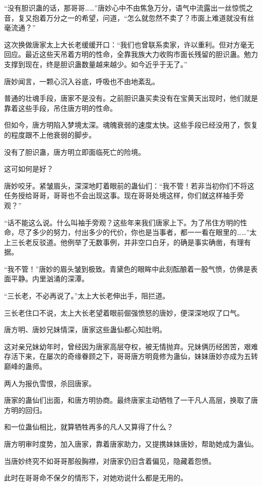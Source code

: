 \begin{this_body}
“没有胆识蛊的话，那哥哥……”唐妙心中不由焦急万分，语气中流露出一丝惊慌之音，复又抱着万分之一的希望，问道，“怎么就忽然不卖了？市面上难道就没有丝毫流通？”

这次换做唐家太上大长老缓缓开口：“我们也曾联系卖家，许以重利。但对方毫无回应。最近这些天吊着方明的性命，全靠我族大力收购市面长残留的胆识蛊。勉力支撑到现在，终是胆识蛊数量越来越少。如今近乎于无了。”

唐妙闻言，一颗心沉入谷底，呼吸也不由地紊乱。

普通的壮魂手段，唐家不是没有。之前胆识蛊买卖没有在宝黄天出现时，他们就是靠着这些手段，吊住唐方明的性命。

但如今，唐方明陷入梦境太深。魂魄衰弱的速度太快。这些手段已经没用了，恢复的程度跟不上他衰弱的脚步。

没有了胆识蛊，唐方明立即面临死亡的险境。

这可如何是好？

唐妙咬牙。紧皱眉头，深深地盯着眼前的蛊仙们：“我不管！若非当初你们不将这任务授给哥哥，哥哥也不会出现这事。现在哥哥处境这样，你们就这样袖手旁观？”

“话不能这么说。什么叫袖手旁观？这些年来我们唐家上下。为了吊住方明的性命，尽了多少的努力，付出多少的代价，你也是当事者，都一一看在眼里的……”太上三长老反驳道。他例举了无数事例，并非空口白牙，的确是事实确凿，有理有据。

“我不管！”唐妙的眉头皱到极致。青黛色的眼眸中此刻酝酿着一股气愤，仿佛是表面平静。内里汹涌的深潭。

“三长老，不必再说了。”太上大长老伸出手，阻拦道。

三长老住口不说，太上大长老望着眼前倔强愤怒的唐妙，便深深地叹了口气。

唐方明、唐妙兄妹情深，唐家这些蛊仙都心知肚明。

这对亲兄妹幼年时，曾经因为唐家高层夺权，被无情抛弃。兄妹俩历经困苦，艰难存活下来，在屡次的奇缘眷顾之下，哥哥唐方明竟修为蛊仙，妹妹唐妙亦成为五转巅峰的蛊师。

两人为报仇雪恨，杀回唐家。

唐家的蛊仙们出面，和唐方明协商。最终唐家主动牺牲了一干凡人高层，换取了唐方明的回归。

和一位蛊仙相比，就算牺牲再多的凡人又算得了什么？

唐方明审时度势，加入唐家，靠着唐家助力，又提携妹妹唐妙，帮助她成为蛊仙。

当唐妙终究不如哥哥那般胸襟，对唐家仍旧含着偏见，隐藏着怨愤。

此时在哥哥命不保夕的情形下，对她劝说什么都是无用的。


\end{this_body}
